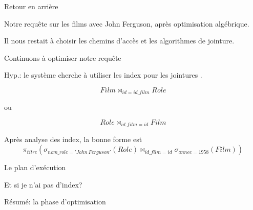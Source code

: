 
\begin{frame}[fragile]{Retour en arrière}

Notre requête sur les films avec John Ferguson, après optimisation algébrique.

\vfill
\begin{small}
\end{small}


\vfill

Il nous restait à choisir les chemins d'accès et les algorithmes de jointure.


    
\end{frame}

\begin{frame}{Continuons à optimiser notre requête}

Hyp.: le système 
cherche à utiliser les index pour les jointures .

\vfill

\[
  Film \Join_{id=id\_film} Role
\]
  
ou 

\[
   Role \Join_{id\_film=id} Film
\]

\vfill

Après analyse des index, la bonne forme est
\[
   \pi_{titre}(\sigma_{nom\_role='John\ Ferguson'}(Role)  \Join_{id\_film=id}  \sigma_{annee=1958} (Film) )
\]

\end{frame}

\begin{frame}{Le plan d'exécution}


\end{frame}


\begin{frame}{Et si je n'ai pas d'index?}


\end{frame}
\begin{frame}{Résumé: la phase d'optimisation}


\vfill
{}
\vfill



\end{frame}

